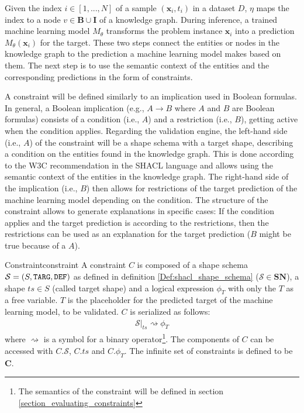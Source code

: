 Given the index $i \in [1,...,N]$ of a sample $(\mathbf{x}_i, t_i)$ in a dataset $D$, $\eta$ maps the index to a node $v \in \mathbf{B} \cup \mathbf{I}$ of a knowledge graph. During inference, a trained machine learning model $M_\theta$ transforms the problem instance $\mathbf{x}_i$ into a prediction $M_\theta(\mathbf{x}_i)$ for the target. These two steps connect the entities or nodes in the knowledge graph to the prediction a machine learning model makes based on them. The next step is to use the semantic context of the entities and the corresponding predictions in the form of constraints.

A constraint will be defined similarly to an implication used in Boolean formulas. In general, a Boolean implication (e.g., $A \rightarrow B$ where $A$ and $B$ are Boolean formulas) consists of a condition (i.e., $A$) and a restriction (i.e., $B$), getting active when the condition applies. Regarding the validation engine, the left-hand side (i.e., $A$) of the constraint will be a shape schema with a target shape, describing a condition on the entities found in the knowledge graph. This is done according to the W3C recommendation in the SHACL language \cite{knublauch2017shapes} and allows using the semantic context of the entities in the knowledge graph. The right-hand side of the implication (i.e., $B$) then allows for restrictions of the target prediction of the machine learning model depending on the condition. The structure of the constraint allows to generate explanations in specific cases: If the condition applies and the target prediction is according to the restrictions, then the restrictions can be used as an explanation for the target prediction ($B$ might be true because of a $A$).

\begin{Def}{Constraint}{constraint}
A constraint $C$ is composed of a shape schema $\mathcal{S} = (S, \texttt{TARG}, \texttt{DEF})$ as defined in definition \ref{Def:shacl_shape_schema} ($\mathcal{S} \in \mathbf{SN}$), a shape $ts \in S$ (called target shape) and a logical expression $\phi_T$ with only the $T$ as a free variable. $T$ is the placeholder for the predicted target of the machine learning model, to be validated. $C$ is serialized as follows:
\begin{gather*}
        \mathcal{S}\big|_{ts} \rightsquigarrow \phi_{T}
\end{gather*}
where $\rightsquigarrow$ is a symbol for a binary operator\footnote{The semantics of the constraint will be defined in section \ref{section_evaluating_constraints}}.
The components of $C$ can be accessed with $C.\mathcal{S}$, $C.ts$ and $C.\phi_{T}$. The infinite set of constraints is defined to be $\mathbf{C}$.
\end{Def}

